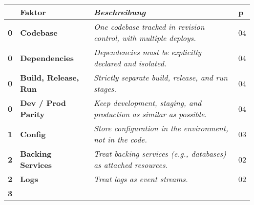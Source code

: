 \setcounter{factorno}{-1}
\begin{longtable}{  |   >{\raggedleft\bfseries}p{}              %
                    |   >{\raggedright\bfseries\small}p{}       %
                    |   >{\raggedright\itshape\small}p{}        %
                    |   >{}p{}                                  %
                    | }
    \hline
          \upshape\normalsize
        & \upshape\normalsize\textbf{Faktor} 
        & \upshape\normalsize\textbf{Beschreibung} \cite{101:The-Twelve-Factor-App}
        & \upshape\normalsize\textbf{\acrshort{p}} \\
    \hline \hline
    \endhead
    \hline
          0
        & %
          Codebase
        & One codebase tracked in revision control, with multiple deploys.
        & 04 \\
    \hline
          0
        & %
          Dependencies
        & Dependencies must be explicitly declared and isolated.
        & 04 \\
    \hline
          0
        & %
          Build, Release, Run
        & Strictly separate build, release, and run stages.
        & 04 \\
    \hline
          0
        & %
          Dev / Prod Parity
        & Keep development, staging, and production as similar as possible.
        & 04 \\
    \hline
          1
        & %
          Config
        & Store configuration in the environment, not in the code.
        & 03 \\
    \hline
          2
        & %
          Backing Services
        & Treat backing services (e.g., databases) as attached resources.
        & 02 \\
    \hline
          2
        & %
          Logs
        & Treat logs as event streams.
        & 02 \\
    \hline
          3
        & %

\end{longtable}
